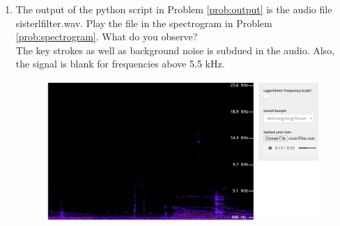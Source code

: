 \documentclass[journal,12pt,twocolumn]{IEEEtran}
\renewcommand\thesection{\arabic{section}}
\begin{document}
\begin{enumerate}[label=\thesection.\arabic*
		,ref=\thesection.\theenumi]
	\item
	      The output of the python script in Problem \ref{prob:output} is the audio file sisterlfilter.wav. Play the file in the spectrogram in Problem \ref{prob:spectrogram}. What do you observe?
	      \\
	      \solution The key strokes as well as background noise is subdued in the audio.  Also,  the signal is blank for frequencies above 5.5 kHz.
	      \begin{figure}[h]
		      \centering
		      \includegraphics[width=\columnwidth]{figs/sisterlfilter.png}
		      \caption{}
		      \label{fig:filteraudiospectrum}
	      \end{figure}

\end{enumerate}
\end{document}
